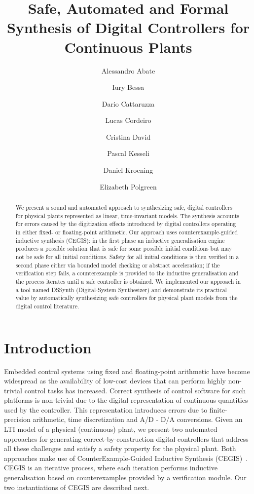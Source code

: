 \documentclass[submission]{eptcs}
\title{Safe, Automated and Formal Synthesis of Digital Controllers 
for Continuous Plants}
\author{Alessandro Abate
\institute{University of Oxford}
\and
Iury Bessa
\institute{Federal University of \\Amazonas, Brazil}
\and
Dario Cattaruzza
\institute{University of Oxford}
\and
Lucas Cordeiro
\institute{University of Manchester}
\and
Cristina David
\institute{University of Cambridge}
\and
Pascal Kesseli
\institute{University of Oxford}
\and
Daniel Kroening
\institute{University of Oxford}
\and
Elizabeth Polgreen
\institute{University of Oxford}
}
\begin{document}
\maketitle

\begin{abstract}
We present a sound and automated approach to synthesizing safe,
digital controllers for physical plants represented as linear,
time-invariant models. The synthesis
accounts for errors caused by the digitization effects introduced by
digital controllers operating in either fixed- or floating-point arithmetic. 
Our approach uses counterexample-guided inductive
synthesis (CEGIS): in the first phase an inductive generalisation engine produces a
possible solution that is safe for some possible initial conditions but may
not be safe for all initial conditions. Safety for all initial conditions
is then verified in a second phase either
via bounded model checking or abstract acceleration; if the verification step fails, a
counterexample is provided to the inductive generalisation and the
process iterates until a safe controller is obtained.  We implemented our approach
in a tool named DSSynth (Digital-System Synthesizer) and demonstrate
its practical value by automatically synthesizing safe controllers for physical 
plant models from the digital control literature.
\end{abstract}

\section{Introduction}

Embedded control systems using fixed and floating-point arithmetic 
have become widespread
as the availability of low-cost devices that can perform highly
non-trivial control tasks has increased. Correct synthesis of
control software for such platforms is non-trivial due to the digital representation of continuous quantities 
used by the controller. This representation introduces 
errors due to finite-precision arithmetic, time discretization and 
A/D - D/A conversions. Given an LTI model of a physical (continuous) plant, we present two automated approaches for generating
correct-by-construction digital controllers that address all these
challenges and satisfy a safety property for the physical plant. 
Both approaches make use of CounterExample-Guided
Inductive Synthesis (CEGIS)~\cite{jha-icse10,
  DBLP:conf/asplos/Solar-LezamaTBSS06}.  CEGIS is an
iterative process, where each iteration performs inductive
generalisation based on counterexamples provided by a verification module. 
Our two instantiations of CEGIS are
described next. 
\end{document}
